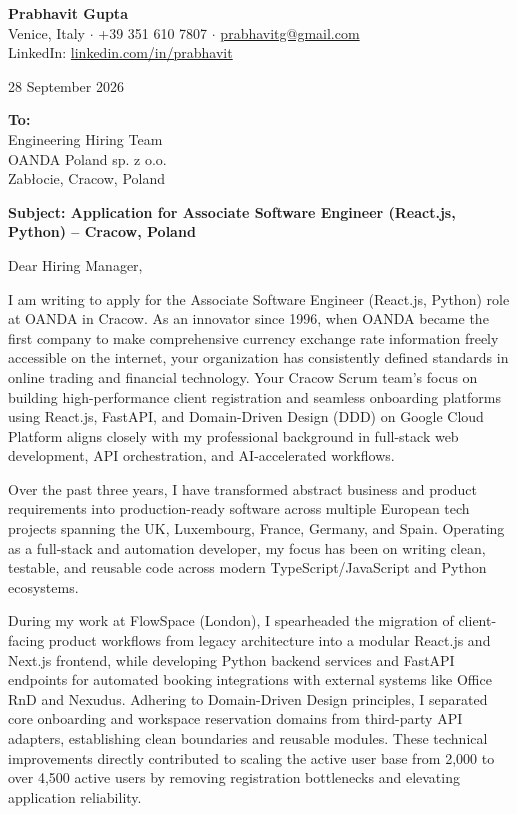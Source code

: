 \documentclass[11pt,a4paper]{article}
\begin{document}
\textbf{\Large Prabhavit Gupta} \\
Venice, Italy $\cdot$ +39 351 610 7807 $\cdot$ \href{mailto:prabhavitg@gmail.com}{prabhavitg@gmail.com} \\
LinkedIn: \href{https://www.linkedin.com/in/prabhavit/}{linkedin.com/in/prabhavit}

\vspace{12pt}
28 September 2026

\vspace{10pt}
\textbf{To:} \\
Engineering Hiring Team \\
OANDA Poland sp. z o.o. \\
Zab\l{}ocie, Cracow, Poland

\vspace{10pt}
\textbf{Subject: Application for Associate Software Engineer (React.js, Python) -- Cracow, Poland}

\vspace{8pt}
Dear Hiring Manager,

I am writing to apply for the Associate Software Engineer (React.js, Python) role at OANDA in Cracow. As an innovator since 1996, when OANDA became the first company to make comprehensive currency exchange rate information freely accessible on the internet, your organization has consistently defined standards in online trading and financial technology. Your Cracow Scrum team's focus on building high-performance client registration and seamless onboarding platforms using React.js, FastAPI, and Domain-Driven Design (DDD) on Google Cloud Platform aligns closely with my professional background in full-stack web development, API orchestration, and AI-accelerated workflows.

Over the past three years, I have transformed abstract business and product requirements into production-ready software across multiple European tech projects spanning the UK, Luxembourg, France, Germany, and Spain. Operating as a full-stack and automation developer, my focus has been on writing clean, testable, and reusable code across modern TypeScript/JavaScript and Python ecosystems.

During my work at FlowSpace (London), I spearheaded the migration of client-facing product workflows from legacy architecture into a modular React.js and Next.js frontend, while developing Python backend services and FastAPI endpoints for automated booking integrations with external systems like Office RnD and Nexudus. Adhering to Domain-Driven Design principles, I separated core onboarding and workspace reservation domains from third-party API adapters, establishing clean boundaries and reusable modules. These technical improvements directly contributed to scaling the active user base from 2,000 to over 4,500 active users by removing registration bottlenecks and elevating application reliability.
\end{document}
